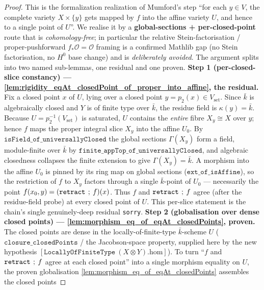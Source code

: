 \begin{proof}
  \leanok
  This is the formalization realization of Mumford's step ``for each \(y \in V\), the complete
  variety \(X \times \{y\}\) gets mapped by \(f\) into the affine variety \(U\), and hence to a single
  point of \(U\)''. We realise it by a \textbf{global-sections + per-closed-point} route that is
  \emph{cohomology-free}; in particular the relative Stein-factorisation / proper-pushforward
  \(f_*\mathcal O = \mathcal O\) framing is a confirmed Mathlib gap (no Stein factorisation, no
  \(H^0\) base change) and is \emph{deliberately avoided}. The argument splits into two named
  sub-lemmas, one residual and one proven.
  \medskip
  \noindent\textbf{Step 1 (per-closed-slice constancy) --- \cref{lem:rigidity_eqAt_closedPoint_of_proper_into_affine}, the residual.}
  Fix a closed point \(x\) of \(U\), lying over a closed point \(y = p_2(x) \in V_{\mathrm{set}}\).
  Since \(\bar k\) is algebraically closed and \(Y\) is of finite type over \(\bar k\), the residue field
  is \(\kappa(y) = \bar k\). Because \(U = p_2^{-1}(V_{\mathrm{set}})\) is saturated, \(U\) contains the
  \emph{entire} fibre \(X_y \cong X\) over \(y\); hence \(f\) maps the proper integral slice \(X_y\) into the
  affine \(U_0\). By \(\mathtt{isField\_of\_universallyClosed}\) the global sections \(\Gamma(X_y)\) form a
  field, module-finite over \(\bar k\) by \(\mathtt{finite\_appTop\_of\_universallyClosed}\), and
  algebraic closedness collapses the finite extension to give \(\Gamma(X_y) = \bar k\). A morphism into
  the affine \(U_0\) is pinned by its ring map on global sections (\(\mathtt{ext\_of\_isAffine}\)), so the
  restriction of \(f\) to \(X_y\) factors through a single \(\bar k\)-point of \(U_0\) --- necessarily the
  point \(f(x_0, y) = (\mathtt{retract} \fatsemi f)(x)\). Thus \(f\) and \(\mathtt{retract} \fatsemi f\)
  agree (after the residue-field probe) at every closed point of \(U\). This per-slice statement is the
  chain's single genuinely-deep residual \texttt{sorry}.
  \medskip
  \noindent\textbf{Step 2 (globalisation over dense closed points) --- \cref{lem:morphism_eq_of_eqAt_closedPoints}, proven.}
  The closed points are dense in the locally-of-finite-type \(\bar k\)-scheme \(U\)
  (\(\mathtt{closure\_closedPoints}\) / the Jacobson-space property, supplied here by the new hypothesis
  \([\mathtt{LocallyOfFiniteType}\ (X \otimes Y).\mathrm{hom}]\)). To turn ``\(f\) and
  \(\mathtt{retract} \fatsemi f\) agree at each closed point'' into a single morphism equality on \(U\),
  the proven globalisation \cref{lem:morphism_eq_of_eqAt_closedPoints} assembles the closed points

\end{proof}
